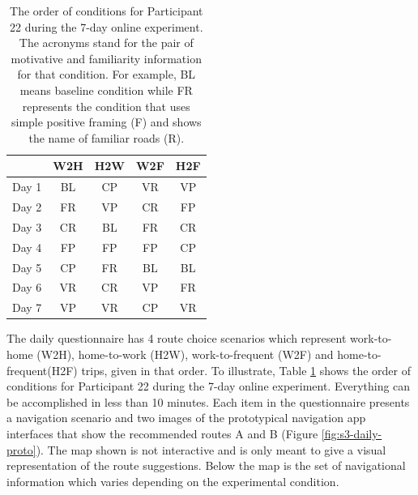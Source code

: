 \begin{table}[h]
    \caption{The order of conditions for Participant 22 during the 7-day online experiment. The acronyms stand for the pair of motivative and familiarity information for that condition. For example, BL means baseline condition while FR represents the condition that uses simple positive framing (F) and shows the name of familiar roads (R).}
	\label{tab:sample-order}
	\centering
	\begin{tabular}{l c c c c}
	    \hline\hline
		& \textbf{W2H} & \textbf{H2W} & \textbf{W2F} & \textbf{H2F} \\
		\hline
		Day 1 & BL & CP & VR & VP \\
        Day 2 & FR & VP & CR & FP \\
        Day 3 & CR & BL & FR & CR \\
        Day 4 & FP & FP & FP & CP \\
        Day 5 & CP & FR & BL & BL \\
        Day 6 & VR & CR & VP & FR \\
        Day 7 & VP & VR & CP & VR \\
		\hline
	\end{tabular}
\end{table}

The daily questionnaire has 4 route choice scenarios which represent work-to-home (W2H), home-to-work (H2W), work-to-frequent (W2F) and home-to-frequent(H2F) trips, given in that order. To illustrate, Table \ref{tab:sample-order} shows the order of conditions for Participant 22 during the 7-day online experiment. Everything can be accomplished in less than 10 minutes. Each item in the questionnaire presents a navigation scenario and two images of the prototypical navigation app interfaces that show the recommended routes A and B (Figure \ref{fig:s3-daily-proto}). The map shown is not interactive and is only meant to give a visual representation of the route suggestions. Below the map is the set of navigational information which varies depending on the experimental condition.

